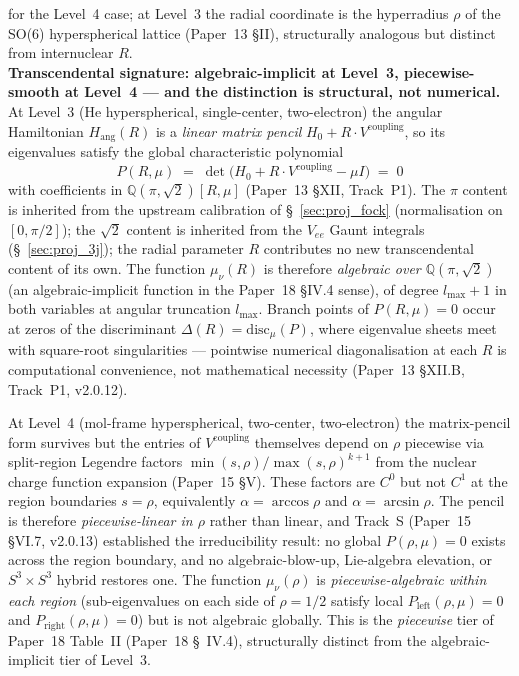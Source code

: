 \documentclass[11pt]{article}
\begin{document}
for the Level~4 case; at Level~3 the radial coordinate is the
hyperradius $\rho$ of the SO(6) hyperspherical lattice (Paper~13
§II), structurally analogous but distinct from internuclear $R$.\\
\textbf{Transcendental signature: algebraic-implicit at Level~3,
piecewise-smooth at Level~4 --- and the distinction is structural,
not numerical.}  At Level~3 (He hyperspherical, single-center,
two-electron) the angular Hamiltonian $H_\text{ang}(R)$ is a
\emph{linear matrix pencil} $H_0 + R \cdot V^\text{coupling}$, so its
eigenvalues satisfy the global characteristic polynomial
\[
  P(R, \mu) \;=\; \det\!\bigl(H_0 + R \cdot V^\text{coupling} - \mu I\bigr)
  \;=\; 0
\]
with coefficients in $\mathbb{Q}(\pi, \sqrt{2})[R, \mu]$ (Paper~13
§XII, Track~P1).  The $\pi$ content is inherited from the upstream
calibration of \S~\ref{sec:proj_fock} (normalisation on $[0, \pi/2]$);
the $\sqrt{2}$ content is inherited from the $V_{ee}$ Gaunt integrals
(\S~\ref{sec:proj_3j}); the radial parameter $R$ contributes no new
transcendental content of its own.  The function $\mu_\nu(R)$ is
therefore \emph{algebraic over $\mathbb{Q}(\pi, \sqrt{2})$} (an
algebraic-implicit function in the Paper~18 §IV.4 sense), of degree
$l_\text{max} + 1$ in both variables at angular truncation
$l_\text{max}$.  Branch points of $P(R, \mu) = 0$ occur at zeros of
the discriminant $\Delta(R) = \mathrm{disc}_\mu(P)$, where eigenvalue
sheets meet with square-root singularities --- pointwise numerical
diagonalisation at each $R$ is computational convenience, not
mathematical necessity (Paper~13 §XII.B, Track~P1, v2.0.12).
\smallskip

At Level~4 (mol-frame hyperspherical, two-center, two-electron) the
matrix-pencil form survives but the entries of $V^\text{coupling}$
themselves depend on $\rho$ piecewise via split-region Legendre
factors $\min(s, \rho) / \max(s, \rho)^{k+1}$ from the nuclear charge
function expansion (Paper~15 §V).  These factors are $C^0$ but not
$C^1$ at the region boundaries $s = \rho$, equivalently $\alpha =
\arccos\rho$ and $\alpha = \arcsin\rho$.  The pencil is therefore
\emph{piecewise-linear in $\rho$} rather than linear, and Track~S
(Paper~15 §VI.7, v2.0.13) established the irreducibility result: no
global $P(\rho, \mu) = 0$ exists across the region boundary, and no
algebraic-blow-up, Lie-algebra elevation, or $S^3 \times S^3$ hybrid
restores one.  The function $\mu_\nu(\rho)$ is \emph{piecewise-algebraic
within each region} (sub-eigenvalues on each side of $\rho = 1/2$
satisfy local $P_\text{left}(\rho, \mu) = 0$ and $P_\text{right}(\rho,
\mu) = 0$) but is not algebraic globally.  This is the
\emph{piecewise} tier of Paper~18 Table~II (Paper~18 \S~IV.4),
structurally distinct from the algebraic-implicit tier of Level~3.
\smallskip
\end{document}
